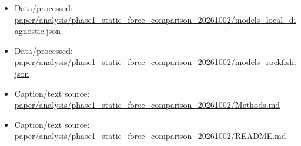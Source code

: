 \begin{itemize}[leftmargin=1.4em,noitemsep]
\item Data/processed: \begingroup\scriptsize\url{paper/analysis/phase1_static_force_comparison_20261002/models_local_diagnostic.json}\endgroup
\item Data/processed: \begingroup\scriptsize\url{paper/analysis/phase1_static_force_comparison_20261002/models_rockfish.json}\endgroup
\item Caption/text source: \begingroup\scriptsize\url{paper/analysis/phase1_static_force_comparison_20261002/Methods.md}\endgroup
\item Caption/text source: \begingroup\scriptsize\url{paper/analysis/phase1_static_force_comparison_20261002/README.md}\endgroup
\end{itemize}

